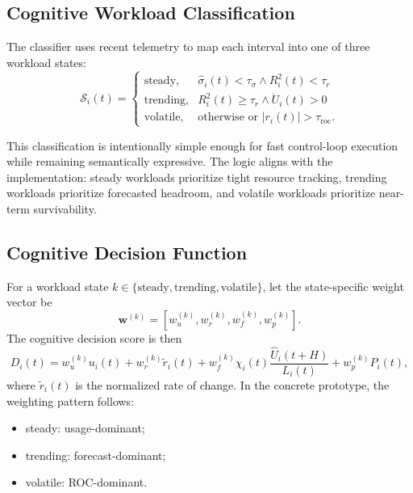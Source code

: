 \documentclass[12pt,a4paper]{article}
\begin{document}
\subsection{Cognitive Workload Classification}

The classifier uses recent telemetry to map each interval into one of three workload states:
\begin{equation}
\label{eq:class_steady}
\mathcal{S}_i(t)=
\begin{cases}
\text{steady}, & \hat{\sigma}_i(t) < \tau_{\sigma} \land R_i^2(t) < \tau_r \\
\text{trending}, & R_i^2(t) \geq \tau_r \land \dot{U}_i(t) > 0 \\
\text{volatile}, & \text{otherwise or } |r_i(t)| > \tau_{\text{roc}}.
\end{cases}
\end{equation}

This classification is intentionally simple enough for fast control-loop execution while remaining semantically expressive. The logic aligns with the implementation: steady workloads prioritize tight resource tracking, trending workloads prioritize forecasted headroom, and volatile workloads prioritize near-term survivability.

\subsection{Cognitive Decision Function}

For a workload state $k \in \{\text{steady},\text{trending},\text{volatile}\}$, let the state-specific weight vector be
\begin{equation}
\mathbf{w}^{(k)} = [w_u^{(k)}, w_r^{(k)}, w_f^{(k)}, w_p^{(k)}].
\end{equation}
The cognitive decision score is then
\begin{equation}
\label{eq:decision}
D_i(t) = w_u^{(k)} u_i(t) + w_r^{(k)} \tilde{r}_i(t) + w_f^{(k)} \chi_i(t)\frac{\hat{U}_i(t+H)}{L_i(t)} + w_p^{(k)} P_i(t),
\end{equation}
where $\tilde{r}_i(t)$ is the normalized rate of change. In the concrete prototype, the weighting pattern follows:
\begin{itemize}
    \item steady: usage-dominant;
    \item trending: forecast-dominant;
    \item volatile: ROC-dominant.
\end{itemize}
\end{document}
